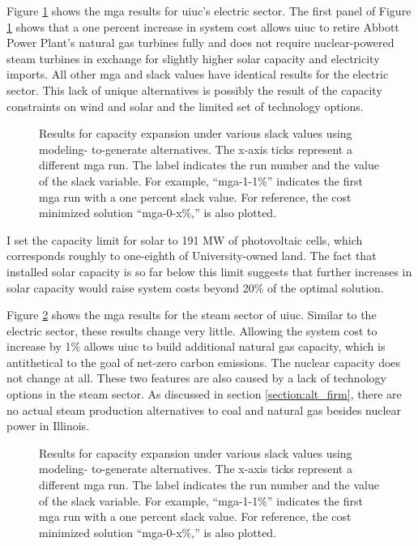 Figure \ref{fig:uiuc_elc_mga} shows the \gls{mga} results for \gls{uiuc}'s electric
sector. The first panel of Figure \ref{fig:uiuc_elc_mga} shows that a one percent
increase in system cost allows \gls{uiuc} to retire Abbott Power Plant's
natural gas turbines fully and does not require nuclear-powered steam turbines
in exchange for slightly higher solar capacity and electricity imports. All other
\gls{mga} and slack values have identical results for the electric sector.
This lack of unique alternatives is possibly the result of the capacity constraints on
wind and solar and the limited set of technology options.

\begin{figure}[H]
  \centering
  \resizebox{0.95\columnwidth}{!}{}
  \caption{Results for capacity expansion under various slack values using modeling-
  to-generate alternatives. The x-axis ticks represent a different \gls{mga} run.
  The label indicates the run number and the value of the slack variable. For example,
  ``mga-1-1\%'' indicates the first \gls{mga} run with a one percent
  slack value. For reference, the cost minimized solution ``mga-0-x\%,'' is also
  plotted.}
  \label{fig:uiuc_elc_mga}
\end{figure}

I set the capacity limit for solar to 191 MW of photovoltaic cells, which corresponds
roughly to one-eighth of University-owned land. The fact that installed solar capacity
is so far below this limit suggests that further increases in solar capacity would
raise system costs beyond 20\% of the optimal solution.

Figure \ref{fig:uiuc_thm_mga} shows the \gls{mga} results for the steam sector
of \gls{uiuc}. Similar to the electric sector, these results change very little.
Allowing the system cost to increase by 1\% allows \gls{uiuc} to build additional
natural gas capacity, which is antithetical to the goal of net-zero carbon emissions.
The nuclear capacity does not change at all. These two features are also caused
by a lack of technology options in the steam sector. As discussed in section
\ref{section:alt_firm}, there are no actual steam production alternatives to coal
and natural gas besides nuclear power in Illinois.


\begin{figure}[H]
  \centering
  \resizebox{0.95\columnwidth}{!}{}
  \caption{Results for capacity expansion under various slack values using modeling-
  to-generate alternatives. The x-axis ticks represent a different \gls{mga} run.
  The label indicates the run number and the value of the slack variable. For example,
  ``mga-1-1\%'' indicates the first \gls{mga} run with a one percent
  slack value. For reference, the cost minimized solution ``mga-0-x\%,'' is also
  plotted.}
  \label{fig:uiuc_thm_mga}
\end{figure}

